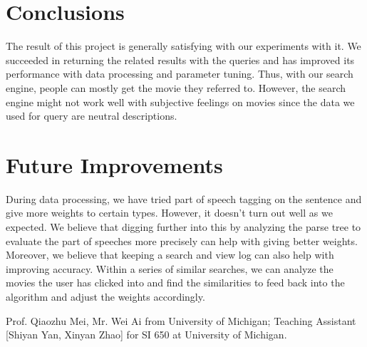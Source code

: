 \documentclass[sigconf,nonacm]{acmart}
\begin{document}
\section{Conclusions}

The result of this project is generally satisfying with our experiments with
it. We succeeded in returning the related results with the queries and has
improved its performance with data processing and parameter tuning. Thus,
with our search engine, people can mostly get the movie they referred to.
However, the search engine might not work well with subjective feelings on
movies since the data we used for query are neutral descriptions.

\section{Future Improvements}
During data processing, we have tried part of speech tagging on the sentence and give more weights to certain types. However, it doesn’t turn out well as we expected. We believe that digging further into this by analyzing the parse tree to evaluate the part of speeches more precisely can help with giving better weights.
Moreover, we believe that keeping a search and view log can also help with improving accuracy. Within a series of similar searches, we can analyze the movies the user has clicked into and find the similarities to feed back into the algorithm and adjust the weights accordingly.

\begin{acks}
  Prof. Qiaozhu Mei, Mr. Wei Ai from University of Michigan;
  Teaching Assistant [Shiyan Yan, Xinyan Zhao] for SI 650 at University of Michigan.
\end{acks}






\end{document}

